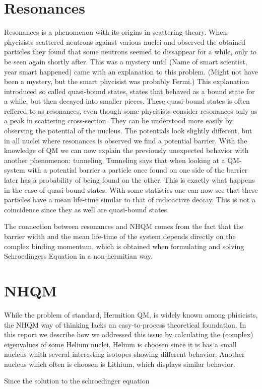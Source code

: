 \section{Resonances}
Resonances is a phenomenon with its origins in scattering theory.
When phycisists scattered neutrons against various nuclei and observed the obtained particles they found that some neutrons seemed to dissappear for a while,
 only to be seen again shortly after.
This was a mystery until (Name of smart scientist, year smart happened) came with an explanation to this problem. (Might not have been a mystery, but the smart phycisist was probably Fermi.)
This explanation introduced so called quasi-bound states, states that behaved as a bound state for a while, but then decayed into smaller pieces.
These quasi-bound states is often reffered to as resonances, even though some phycisists consider resonances only as a peak in scattering cross-section.
They can be understood more easily by observing the potential of the nucleus.
The potentials look slightly different, but in all nuclei where resonances is observed we find a potential barrier.
With the knowledge of QM we can now explain the previously unexpected behavior with another phenomenon: tunneling.
Tunneling says that when looking at a QM-system with a potential barrier a particle once found on one side of the barrier later has a probability of being found on the other.
This is exactly what happens in the case of quasi-bound states.
With some statistics one can now see that these particles have a mean life-time similar to that of radioactive deccay.
This is not a coincidence since they as well are quasi-bound states.

The connection between resonances and NHQM comes from the fact that the barrier width and the mean life-time of the system depends directly on the complex binding momentum,
which is obtained when formulating and solving Schroedingers Equation in a non-hermitian way.


\section{NHQM}
While the problem of standard, Hermition QM, is widely known among phisicists, the NHQM way of thinking lacks an easy-to-process theoretical foundation.
In this report we describe how we addressed this issue by calculating the (complex) eigenvalues of some Helium nuclei.
Helium is choosen since it is has a small nucleus whith several interesting isotopes showing different behavior.
Another nucleus which often is choosen is Lithium, which displays similar behavior.

Since the solution to the schroedinger equation 


